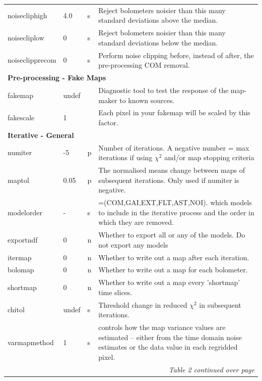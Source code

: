 \documentclass[twoside,11pt]{article}
\newenvironment{latexonly}{}{}
\renewcommand{\_}{\texttt{\symbol{95}}}
\begin{document}
\begin{latexonly}
\begin{table}
\begin{center}
\begin{footnotesize}
\begin{tabular}{|p{2.1cm}|p{0.8cm}|p{0.2cm}|p{11.2cm}|}
 noisecliphigh & 4.0 &s &Reject bolometers noisier than this many standard deviations above the median.\\
 noisecliplow & 0 &s& Reject bolometers noisier than this many standard deviations below the median.\\
 noiseclipprecom & 0 &s &Perform noise clipping before, instead of after, the pre-processing COM removal.\\
\hline
\multicolumn{4}{|l|}{\textbf{Pre-processing - Fake Maps}}\\
\hline
fakemap & undef&& Diagnostic tool to test the response of the map-maker to known sources.  \\
fakescale & 1 && Each pixel in your fakemap will be scaled by this factor. \\


\hline
\multicolumn{4}{|l|}{\textbf{Iterative - General}}\\
\hline
numiter & -5 &p& Number of iterations. A negative number = max iterations
                       if using $\chi^2$ and/or map stopping criteria\\
maptol & 0.05 &p &The normalised means change between maps of subsequent iterations. Only used if numiter is negative.\\
modelorder & - &s& =(COM,GAI,EXT,FLT,AST,NOI). which models to include in the iterative process and the order in which they are removed. \\
exportndf & 0 &n& Whether to export all or any of the models. Do not export any models\\
itermap & 0 &n& Whether to write out a map after each iteration.\\
bolomap & 0 &n& Whether to write out a map for each bolometer.\\
shortmap & 0 &n& Whether to write out a map every 'shortmap' time slices.\\
chitol & undef &s& Threshold change in reduced $\chi^2$ in subsequent
                       iterations.\\
varmapmethod & 1 &s& controls how the map variance values are estimated -- either from the time domain noise estimates or the data value in each regridded pixel.\\

\hline
 \multicolumn{4}{|r|}{\emph{Table 2 continued over page}}\\
\hline
\end{tabular}
\label{tab:dimmdef}
\end{footnotesize}
\end{center}
\end{table}



\end{latexonly}
\end{document}

